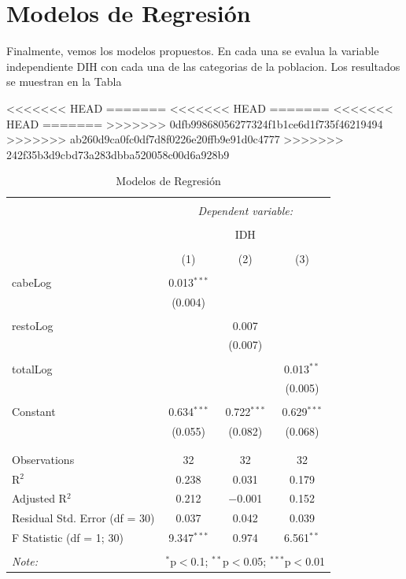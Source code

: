 \section{Modelos de Regresión}

Finalmente, vemos los modelos propuestos. En cada una se evalua la variable independiente DIH con cada una de las categorias de la poblacion. Los resultados se muestran en la Tabla 


<<<<<<< HEAD
=======
<<<<<<< HEAD
=======
<<<<<<< HEAD
=======
>>>>>>> 0dfb99868056277324f1b1ce6d1f735f46219494
>>>>>>> ab260d9ca0fc0df7d8f0226e20ffb9e91d0c4777
>>>>>>> 242f35b3d9cbd73a283dbba520058c00d6a928b9
\begin{table}[!htbp] \centering 
  \caption{Modelos de Regresión} 
  \label{regresiones} 
\begin{tabular}{@{\extracolsep{5pt}}lccc} 
\\[-1.8ex]\hline 
\hline \\[-1.8ex] 
 & \multicolumn{3}{c}{\textit{Dependent variable:}} \\ 
\cline{2-4} 
\\[-1.8ex] & \multicolumn{3}{c}{IDH} \\ 
\\[-1.8ex] & (1) & (2) & (3)\\ 
\hline \\[-1.8ex] 
 cabeLog & 0.013$^{***}$ &  &  \\ 
  & (0.004) &  &  \\ 
  & & & \\ 
 restoLog &  & 0.007 &  \\ 
  &  & (0.007) &  \\ 
  & & & \\ 
 totalLog &  &  & 0.013$^{**}$ \\ 
  &  &  & (0.005) \\ 
  & & & \\ 
 Constant & 0.634$^{***}$ & 0.722$^{***}$ & 0.629$^{***}$ \\ 
  & (0.055) & (0.082) & (0.068) \\ 
  & & & \\ 
\hline \\[-1.8ex] 
Observations & 32 & 32 & 32 \\ 
R$^{2}$ & 0.238 & 0.031 & 0.179 \\ 
Adjusted R$^{2}$ & 0.212 & $-$0.001 & 0.152 \\ 
Residual Std. Error (df = 30) & 0.037 & 0.042 & 0.039 \\ 
F Statistic (df = 1; 30) & 9.347$^{***}$ & 0.974 & 6.561$^{**}$ \\ 
\hline 
\hline \\[-1.8ex] 
\textit{Note:}  & \multicolumn{3}{r}{$^{*}$p$<$0.1; $^{**}$p$<$0.05; $^{***}$p$<$0.01} \\ 
\end{tabular} 
\end{table} 

